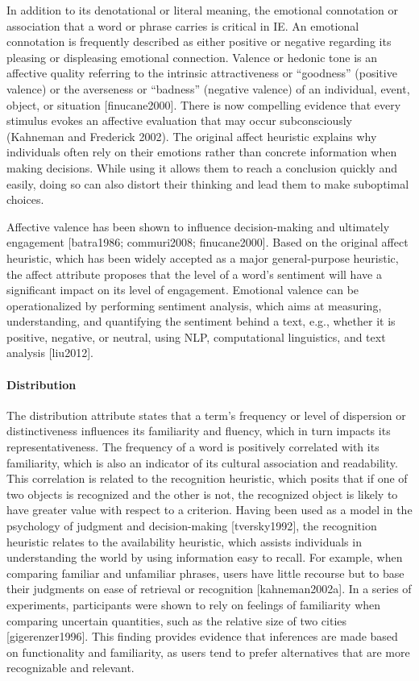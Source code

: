 \documentclass[
]{book}
\begin{document}
In addition to its denotational or literal meaning, the emotional connotation or association that a word or phrase carries is critical in IE. An emotional connotation is frequently described as either positive or negative regarding its pleasing or displeasing emotional connection. Valence or hedonic tone is an affective quality referring to the intrinsic attractiveness or ``goodness'' (positive valence) or the averseness or ``badness'' (negative valence) of an individual, event, object, or situation {[}finucane2000{]}. There is now compelling evidence that every stimulus evokes an affective evaluation that may occur subconsciously (Kahneman and Frederick 2002). The original affect heuristic explains why individuals often rely on their emotions rather than concrete information when making decisions. While using it allows them to reach a conclusion quickly and easily, doing so can also distort their thinking and lead them to make suboptimal choices.

Affective valence has been shown to influence decision-making and ultimately engagement {[}batra1986; commuri2008; finucane2000{]}. Based on the original affect heuristic, which has been widely accepted as a major general-purpose heuristic, the affect attribute proposes that the level of a word's sentiment will have a significant impact on its level of engagement. Emotional valence can be operationalized by performing sentiment analysis, which aims at measuring, understanding, and quantifying the sentiment behind a text, e.g., whether it is positive, negative, or neutral, using NLP, computational linguistics, and text analysis {[}liu2012{]}.

\paragraph{Distribution}\label{distribution}

The distribution attribute states that a term's frequency or level of dispersion or distinctiveness influences its familiarity and fluency, which in turn impacts its representativeness. The frequency of a word is positively correlated with its familiarity, which is also an indicator of its cultural association and readability. This correlation is related to the recognition heuristic, which posits that if one of two objects is recognized and the other is not, the recognized object is likely to have greater value with respect to a criterion. Having been used as a model in the psychology of judgment and decision-making {[}tversky1992{]}, the recognition heuristic relates to the availability heuristic, which assists individuals in understanding the world by using information easy to recall. For example, when comparing familiar and unfamiliar phrases, users have little recourse but to base their judgments on ease of retrieval or recognition {[}kahneman2002a{]}. In a series of experiments, participants were shown to rely on feelings of familiarity when comparing uncertain quantities, such as the relative size of two cities {[}gigerenzer1996{]}. This finding provides evidence that inferences are made based on functionality and familiarity, as users tend to prefer alternatives that are more recognizable and relevant.
\end{document}

